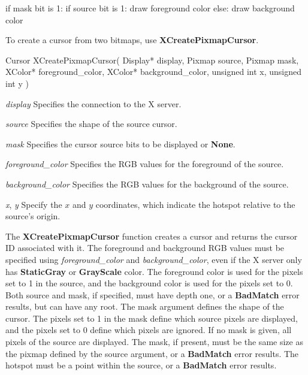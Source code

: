 \documentclass{report}
\begin{document}
\begin{itemize}
\begin{cppcode}
                if mask bit is 1:
                    if source bit is 1:
                        draw foreground color
                    else:
                        draw background color
            \end{cppcode}
            \bigbreak \noindent
            To create a cursor from two bitmaps, use \textbf{XCreatePixmapCursor}.
            \begin{cppcode}
                Cursor XCreatePixmapCursor(
                    Display* display,
                    Pixmap source,
                    Pixmap mask,
                    XColor* foreground_color,
                    XColor* background_color,
                    unsigned int x, unsigned int y
                )
            \end{cppcode}
            \begin{description}
                \item \textit{display} Specifies the connection to the X server.
                \item \textit{source} Specifies the shape of the source cursor.
                \item \textit{mask} Specifies the cursor source bits to be displayed or \textbf{None}.
                \item \textit{foreground\_color} Specifies the RGB values for the foreground of the source.
                \item \textit{background\_color} Specifies the RGB values for the background of the source.
                \item \textit{x}, \textit{y} Specify the $x$ and $y$ coordinates, which indicate the hotspot relative to the source's origin.
            \end{description}
            The \textbf{XCreatePixmapCursor} function creates a cursor and returns the cursor ID associated with it. The foreground and background RGB values must be specified using \textit{foreground\_color} and \textit{background\_color}, even if the X server only has \textbf{StaticGray} or \textbf{GrayScale} color. The foreground color is used for the pixels set to 1 in the source, and the background color is used for the pixels set to 0. Both source and mask, if specified, must have depth one, or a \textbf{BadMatch} error results, but can have any root. The mask argument defines the shape of the cursor. The pixels set to 1 in the mask define which source pixels are displayed, and the pixels set to 0 define which pixels are ignored. If no mask is given, all pixels of the source are displayed. The mask, if present, must be the same size as the pixmap defined by the source argument, or a \textbf{BadMatch} error results. The hotspot must be a point within the source, or a \textbf{BadMatch} error results.

\end{itemize}
\end{document}
